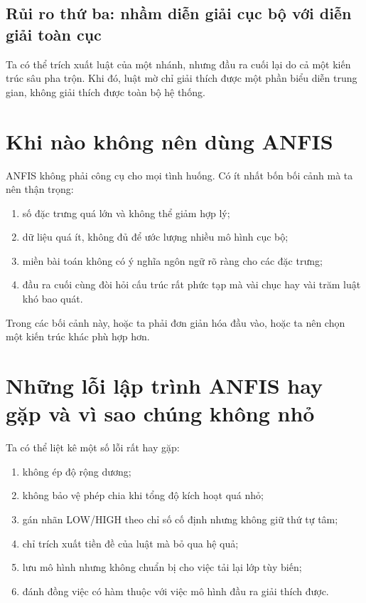 \subsection{Rủi ro thứ ba: nhầm diễn giải cục bộ với diễn giải toàn cục}

Ta có thể trích xuất luật của một nhánh, nhưng đầu ra cuối lại do cả một kiến trúc sâu pha trộn. Khi đó, luật mờ chỉ giải thích được một phần biểu diễn trung gian, không giải thích được toàn bộ hệ thống.

\section{Khi nào không nên dùng ANFIS}

ANFIS không phải công cụ cho mọi tình huống. Có ít nhất bốn bối cảnh mà ta nên thận trọng:

\begin{enumerate}
\item số đặc trưng quá lớn và không thể giảm hợp lý;
\item dữ liệu quá ít, không đủ để ước lượng nhiều mô hình cục bộ;
\item miền bài toán không có ý nghĩa ngôn ngữ rõ ràng cho các đặc trưng;
\item đầu ra cuối cùng đòi hỏi cấu trúc rất phức tạp mà vài chục hay vài trăm luật khó bao quát.
\end{enumerate}

Trong các bối cảnh này, hoặc ta phải đơn giản hóa đầu vào, hoặc ta nên chọn một kiến trúc khác phù hợp hơn.

\section{Những lỗi lập trình ANFIS hay gặp và vì sao chúng không nhỏ}

Ta có thể liệt kê một số lỗi rất hay gặp:

\begin{enumerate}
\item không ép độ rộng dương;
\item không bảo vệ phép chia khi tổng độ kích hoạt quá nhỏ;
\item gán nhãn LOW/HIGH theo chỉ số cố định nhưng không giữ thứ tự tâm;
\item chỉ trích xuất tiền đề của luật mà bỏ qua hệ quả;
\item lưu mô hình nhưng không chuẩn bị cho việc tải lại lớp tùy biến;
\item đánh đồng việc có hàm thuộc với việc mô hình đầu ra giải thích được.
\end{enumerate}

